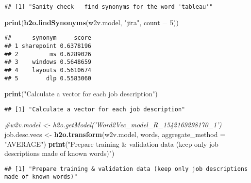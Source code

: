 \documentclass[]{article}
\newenvironment{Shaded}{\begin{snugshade}}{\end{snugshade}}
\newcommand{\KeywordTok}[1]{\textcolor[rgb]{0.13,0.29,0.53}{\textbf{{#1}}}}
\newcommand{\DataTypeTok}[1]{\textcolor[rgb]{0.13,0.29,0.53}{{#1}}}
\newcommand{\DecValTok}[1]{\textcolor[rgb]{0.00,0.00,0.81}{{#1}}}
\newcommand{\FloatTok}[1]{\textcolor[rgb]{0.00,0.00,0.81}{{#1}}}
\newcommand{\StringTok}[1]{\textcolor[rgb]{0.31,0.60,0.02}{{#1}}}
\newcommand{\CommentTok}[1]{\textcolor[rgb]{0.56,0.35,0.01}{\textit{{#1}}}}
\newcommand{\NormalTok}[1]{{#1}}
\begin{document}
\begin{verbatim}
## [1] "Sanity check - find synonyms for the word 'tableau'"
\end{verbatim}

\begin{Shaded}
\begin{Highlighting}[]
\KeywordTok{print}\NormalTok{(}\KeywordTok{h2o.findSynonyms}\NormalTok{(w2v.model, }\StringTok{"jira"}\NormalTok{, }\DataTypeTok{count =} \DecValTok{5}\NormalTok{))}
\end{Highlighting}
\end{Shaded}

\begin{verbatim}
##      synonym     score
## 1 sharepoint 0.6378196
## 2         ms 0.6289026
## 3    windows 0.5648659
## 4    layouts 0.5610674
## 5        dlp 0.5583060
\end{verbatim}

\begin{Shaded}
\begin{Highlighting}[]
\KeywordTok{print}\NormalTok{(}\StringTok{"Calculate a vector for each job description"}\NormalTok{)}
\end{Highlighting}
\end{Shaded}

\begin{verbatim}
## [1] "Calculate a vector for each job description"
\end{verbatim}

\begin{Shaded}
\begin{Highlighting}[]
\CommentTok{#w2v.model <- h2o.getModel('Word2Vec_model_R_1542169298170_1')}
\NormalTok{job.desc.vecs <-}\StringTok{ }\KeywordTok{h2o.transform}\NormalTok{(w2v.model, words, }\DataTypeTok{aggregate_method =} \StringTok{"AVERAGE"}\NormalTok{)}
\KeywordTok{print}\NormalTok{(}\StringTok{"Prepare training & validation data (keep only job descriptions made of known words)"}\NormalTok{)}
\end{Highlighting}
\end{Shaded}

\begin{verbatim}
## [1] "Prepare training & validation data (keep only job descriptions made of known words)"
\end{verbatim}

\begin{Shaded}
\end{Shaded}
\end{document}
